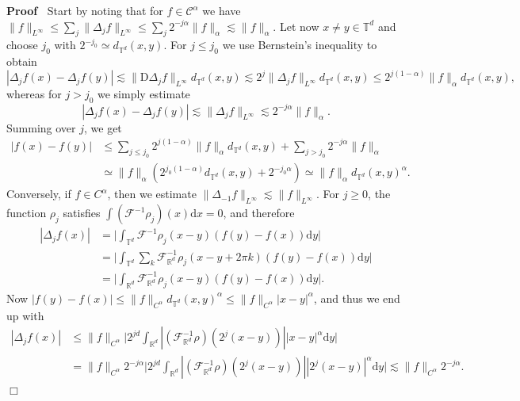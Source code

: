\documentclass[a4paper,11pt]{article}
\newcommand{\mathD}{\mathrm{D}}
\newcommand{\mathd}{\mathrm{d}}
\newenvironment{proof}{\noindent\textbf{Proof\ }}{\hspace*{\fill}$\Box$\medskip}
\newcommand{\CF}{\mathscr{F}}
\newcommand{\CC}{\mathscr{C}}
\begin{document}
\begin{proof}
  Start by noting that for $f \in \CC^{\alpha}$ we have $\| f \|_{L^{\infty}}
  \leqslant \sum_j \| \Delta_j f \|_{L^{\infty}} \leqslant \sum_j 2^{- j
  \alpha} \| f \|_{\alpha} \lesssim \| f \|_{\alpha}$. Let now $x \neq y \in
  \mathbb{T}^d$ and choose $j_0$ with $2^{- j_0} \simeq d_{\mathbb{T}^d} (x,
  y)$. For $j \leqslant j_0$ we use Bernstein's inequality to obtain
  \[ | \Delta_j f (x) - \Delta_j f (y) | \lesssim \| \mathD \Delta_j f
     \|_{L^{\infty}} d_{\mathbb{T}^d} (x, y) \lesssim 2^j \| \Delta_j f
     \|_{L^{\infty}} d_{\mathbb{T}^d} (x, y) \leqslant 2^{j (1 - \alpha)} \| f
     \|_{\alpha} d_{\mathbb{T}^d} (x, y), \]
  whereas for $j > j_0$ we simply estimate
  \[ | \Delta_j f (x) - \Delta_j f (y) | \lesssim \| \Delta_j f
     \|_{L^{\infty}} \lesssim 2^{- j \alpha} \| f \|_{\alpha} . \]
  Summing over $j$, we get
  \begin{align*}
     | f (x) - f (y) | & \leqslant \sum_{j \leqslant j_0} 2^{j (1 - \alpha)} \| f \|_{\alpha} d_{\mathbb{T}^d} (x, y) + \sum_{j > j_0} 2^{- j \alpha} \| f \|_{\alpha} \\
     & \simeq \| f \|_{\alpha} (2^{j_0 (1 - \alpha)} d_{\mathbb{T}^d} (x, y) +  2^{- j_0 \alpha}) \simeq \| f \|_{\alpha} d_{\mathbb{T}^d} (x, y)^{\alpha}.
  \end{align*}
  Conversely, if $f \in C^{\alpha}$, then we estimate $\| \Delta_{- 1} f
  \|_{L^{\infty}} \lesssim \| f \|_{L^{\infty}}$. For $j \geqslant 0$, the
  function $\rho_j$ satisfies $\int (\CF^{-1} \rho_j)(x) \mathd x = 0$, and therefore
  \begin{align*}
     | \Delta_j f (x) | & = \Big| \int_{\mathbb{T}^d} \CF^{- 1} \rho_j (x - y) (f (y) - f (x)) \mathd y \Big| \\
     & = \Big| \int_{\mathbb{T}^d} \sum_k \CF^{- 1}_{\mathbb{R}^d} \rho_j (x - y + 2 \pi k) (f (y) - f (x)) \mathd y \Big| \\
     & = \Big| \int_{\mathbb{R}^d} \CF^{- 1}_{\mathbb{R}^d} \rho_j (x - y) (f(y) - f (x)) \mathd y \Big|.
  \end{align*}
  Now $| f (y) - f (x) | \leqslant \| f \|_{C^{\alpha}} d_{\mathbb{T}^d} (x,
  y)^{\alpha} \leqslant \| f \|_{C^{\alpha}} | x - y |^{\alpha}$, and
  thus we end up with
  \begin{align*}
     | \Delta_j f (x) | & \leqslant \| f \|_{C^{\alpha}} \Big| 2^{j d} \int_{\mathbb{R}^d} | ( \CF^{- 1}_{\mathbb{R}^d} \rho ) (2^j (x - y)) |  | x - y |^{\alpha} \mathd y \Big| \\
     & = \| f \|_{C^{\alpha}} 2^{-j\alpha} \Big| 2^{j d} \int_{\mathbb{R}^d} | ( \CF^{- 1}_{\mathbb{R}^d} \rho ) (2^j (x - y)) |  | 2^j (x - y) |^{\alpha} \mathd y \Big| \lesssim \| f \|_{C^{\alpha}} 2^{- j \alpha}.
  \end{align*}
\end{proof}
\end{document}
